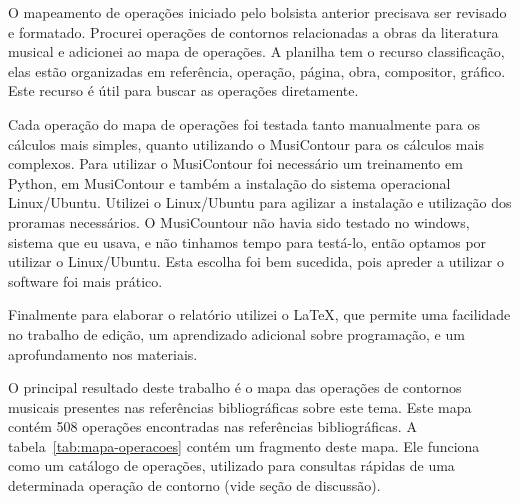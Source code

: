 \documentclass[11pt]{article}
\begin{document}
O mapeamento de operações iniciado pelo bolsista anterior precisava
ser revisado e formatado.  Procurei operações de contornos
relacionadas a obras da literatura musical e adicionei ao mapa de
operações.
A planilha tem o recurso classificação, elas estão organizadas em
referência, operação, página, obra, compositor, gráfico.  Este recurso
é útil para buscar as operações diretamente.

Cada operação do mapa de operações foi testada tanto manualmente para os
cálculos mais simples, quanto utilizando o MusiContour para os cálculos mais
complexos. Para utilizar o MusiContour foi necessário um treinamento em Python,
em MusiContour e também a instalação do sistema operacional
Linux/Ubuntu.
Utilizei o Linux/Ubuntu para
agilizar a instalação e utilização dos proramas necessários. O MusiCountour não
havia sido testado no windows, sistema que eu usava, e não
tinhamos tempo para testá-lo, então optamos por utilizar o
Linux/Ubuntu.
Esta escolha foi bem sucedida, pois apreder a utilizar o software
foi mais prático.

Finalmente para elaborar o relatório utilizei o \LaTeX, que permite
uma facilidade no trabalho de edição, um aprendizado adicional sobre
programação, e um aprofundamento nos materiais.

\label{sec:resultados}


O principal resultado deste trabalho é o mapa das operações de
contornos musicais presentes nas referências bibliográficas sobre este
tema. Este mapa contém 508 operações encontradas nas referências
bibliográficas. A tabela~\ref{tab:mapa-operacoes} contém um fragmento
deste mapa. Ele funciona como um catálogo de operações, utilizado para
consultas rápidas de uma determinada operação de contorno (vide seção
de discussão).
\end{document}
